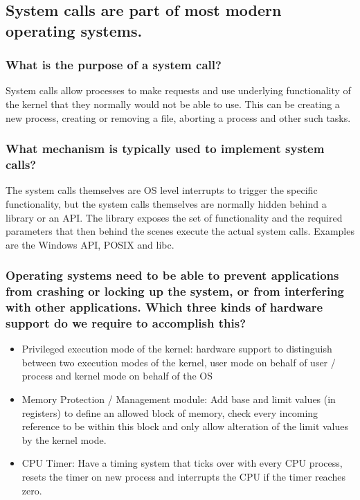 \documentclass[]{article}
\begin{document}
        \subsection{System calls are part of most modern operating systems.}

            \subsubsection{What is the purpose of a system call?}

            System calls allow processes to make requests and use underlying functionality of the kernel that they normally would not be able to use. This can be creating a new process, creating or removing a file, aborting a process and other such tasks.

            \subsubsection{What mechanism is typically used to implement system calls?}

            The system calls themselves are OS level interrupts to trigger the specific functionality, but the system calls themselves are normally hidden behind a library or an API. The library exposes the set of functionality and the required parameters that then behind the scenes execute the actual system calls. Examples are the Windows API, POSIX and libc.

        \subsubsection{Operating systems need to be able to prevent applications from crashing or locking up the system, or from interfering with other applications. Which three kinds of hardware support do we require to accomplish this?}

        \begin{itemize}
            \item Privileged execution mode of the kernel: hardware support to distinguish between two execution modes of the kernel, user mode on behalf of user / process and kernel mode on behalf of the OS
            \item Memory Protection / Management module: Add base and limit values (in registers) to define an allowed block of memory, check every incoming reference to be within this block and only allow alteration of the limit values by the kernel mode.
            \item CPU Timer: Have a timing system that ticks over with every CPU process, resets the timer on new process and interrupts the CPU if the timer reaches zero.
        \end{itemize}
\end{document}
